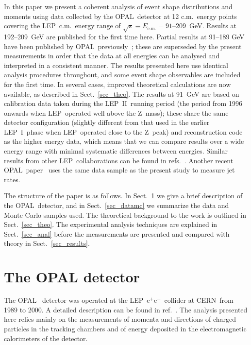 \documentclass[12pt,a4paper,twoside]{article}
\newcommand{\epem}   {\ensuremath{\mathrm{e^+e^-}}}
\newcommand{\zzero}  {\ensuremath{\mathrm{Z}}}
\newcommand{\ecm}   {\ensuremath{E_{\mathrm{c.m.}}}}
\newcommand{\rs}     {\ensuremath{\sqrt{s}}}
\newcommand{\Opal}{\mbox{\rm OPAL}}
\newcommand{\Lep}{\mbox{LEP}}
\newcommand{\Cern}{\mbox{CERN}}
\newcommand{\Leptwo}{\mbox{\rm LEP II}}
\newcommand{\Lepone}{\mbox{LEP I }}
\begin{document}
In this paper we present a coherent analysis of event shape
distributions and moments using data collected by 
the \Opal\ detector at 12 c.m.\ energy points covering 
the \Lep\ c.m.\ energy range of $\rs\equiv\ecm=91$--209~GeV.
Results at 192--209~GeV 
are published for the first time here.
Partial results at 91--189 GeV have been published by \Opal\
previously~\cite{OPALPR075,OPALPR158,OPALPR197,OPALPR303};
these are superseded by the present measurements
in order that the data at all energies can be analysed and 
interpreted in a consistent manner.
The results  presented here  
use identical analysis procedures throughout, 
and some event shape observables are included for the first time.  
In several cases, improved theoretical calculations are now available,
as described in Sect.~\ref{sec_theo}. 
The results at 91~GeV are based on
calibration data taken during the \Leptwo\ running period
(the period from 1996 onwards when \Lep\ operated well above the
\zzero\ mass);
these share the same detector configuration (slightly different from 
that used in the earlier \Lepone phase 
when \Lep\ operated close to the \zzero\ peak)
and reconstruction code as the higher energy data, 
which means that we can compare results over a wide energy 
range with minimal systematic differences between energies. 
Similar results from other \Lep\ collaborations can be
found in refs.~\cite{alephas133,alephas209,delphias133,delphias183,delphias209,l3as133,l3as161172,l3as183,l3as189,l3as209}.
Another recent \Opal\ paper~\cite{OPALjets} uses the same data sample
as the present study to measure jet rates.

The structure of the paper is as follows.
In Sect.~\ref{sec_detector} we give a brief description of the \Opal\
detector, and in Sect.~\ref{sec_datamc} we summarize the data and
Monte Carlo samples used.  The theoretical background to the work is 
outlined in Sect.~\ref{sec_theo}.  The experimental analysis 
techniques are explained in Sect.~\ref{sec_anal} before the measurements
are presented and compared with theory in Sect.~\ref{sec_results}.

\section{ The OPAL detector}
\label{sec_detector}

The \Opal\ %
detector was operated at the \Lep\ \epem\ collider at \Cern\ 
from 1989 to 2000.  A detailed
description can be found in ref.~\cite{opaltechnicalpaper}. The
analysis presented here relies mainly on the measurements of momenta
and directions of charged particles in the tracking chambers and of
energy deposited in the electromagnetic calorimeters of
the detector.
 
\end{document}
